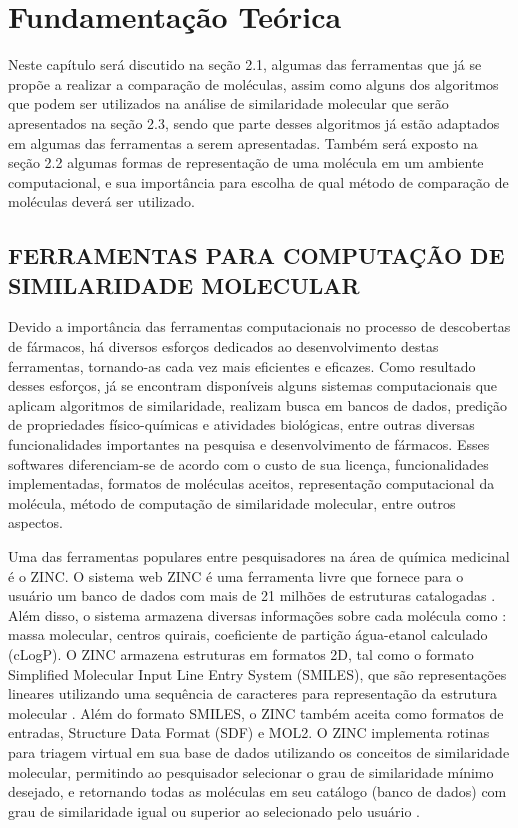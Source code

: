 
\chapter{Fundamentação Teórica}
\label{chap:fundam}
Neste capítulo será discutido na seção 2.1, algumas das ferramentas que já se propõe a realizar
a comparação de moléculas, assim como alguns dos algoritmos que podem ser utilizados na 
análise de similaridade molecular que serão apresentados na seção 2.3, sendo que parte desses 
algoritmos já estão adaptados em algumas das ferramentas a serem apresentadas.
Também será exposto na seção 2.2 algumas formas de representação de uma molécula em um 
ambiente computacional, e sua importância para escolha de qual método de comparação de 
moléculas deverá ser utilizado.
\newpage
\section{FERRAMENTAS PARA COMPUTAÇÃO DE SIMILARIDADE MOLECULAR}
\setcounter{equation}{1}
Devido a importância das ferramentas computacionais no processo de descobertas de fármacos, há diversos esforços dedicados ao desenvolvimento destas ferramentas, tornando-as cada vez mais eficientes e eficazes. Como resultado desses esforços, já se encontram disponíveis alguns sistemas computacionais que aplicam algoritmos de similaridade, realizam busca em bancos de dados, predição de propriedades físico-químicas e atividades biológicas, entre outras diversas funcionalidades importantes na pesquisa e desenvolvimento de fármacos. Esses softwares diferenciam-se de acordo com o custo de sua licença, funcionalidades implementadas, formatos de moléculas aceitos, representação computacional da molécula, método de computação de similaridade molecular, entre outros aspectos.

Uma das ferramentas populares entre pesquisadores na área de química medicinal é o ZINC. O sistema web ZINC é uma ferramenta livre que fornece para o usuário um banco de dados com mais de 21 milhões de estruturas catalogadas \cite{irwin2005zinc}. Além disso, o sistema armazena diversas informações  sobre cada molécula como : massa molecular, centros quirais, coeficiente de partição água-etanol calculado (cLogP). O ZINC armazena estruturas em formatos 2D, tal como o formato Simplified Molecular Input Line Entry System (SMILES), que são representações lineares utilizando uma sequência de caracteres para representação da estrutura molecular \cite{kumar2012}. Além do formato SMILES, o ZINC também aceita como formatos de entradas, Structure Data Format (SDF) e MOL2. O ZINC implementa rotinas para triagem virtual em sua base de dados utilizando os conceitos de similaridade molecular, permitindo ao pesquisador selecionar o grau de similaridade mínimo desejado, e retornando todas as moléculas em seu catálogo (banco de dados) com grau de similaridade igual ou superior ao selecionado pelo usuário \cite{irwin2005zinc}.

